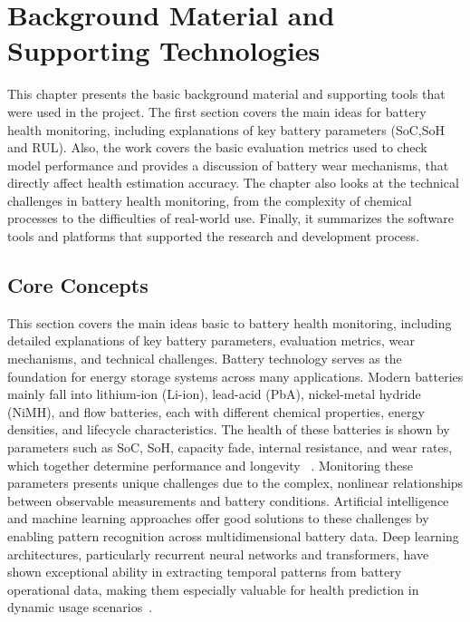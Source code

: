 \chapter{Background Material and Supporting Technologies}
\label{ch:background}

This chapter presents the basic background material and supporting tools that were used in the project. The first section covers the main ideas for battery health monitoring, including explanations of key battery parameters (SoC,SoH and RUL). Also, the work covers the basic evaluation metrics used to check model performance and provides a discussion of battery wear mechanisms, that directly affect health estimation accuracy. The chapter also looks at the technical challenges in battery health monitoring, from the complexity of chemical processes to the difficulties of real-world use. Finally, it summarizes the software tools and platforms that supported the research and development process.

\section{Core Concepts}

This section covers the main ideas basic to battery health monitoring, including detailed explanations of key battery parameters, evaluation metrics, wear mechanisms, and technical challenges. Battery technology serves as the foundation for energy storage systems across many applications. Modern batteries mainly fall into lithium-ion (Li-ion), lead-acid (PbA), nickel-metal hydride (NiMH), and flow batteries, each with different chemical properties, energy densities, and lifecycle characteristics. The health of these batteries is shown by parameters such as SoC, SoH, capacity fade, internal resistance, and wear rates, which together determine performance and longevity ~\cite{vijaychandra_comprehensive_2024}. Monitoring these parameters presents unique challenges due to the complex, nonlinear relationships between observable measurements and battery conditions. Artificial intelligence and machine learning approaches offer good solutions to these challenges by enabling pattern recognition across multidimensional battery data. Deep learning architectures, particularly recurrent neural networks and transformers, have shown exceptional ability in extracting temporal patterns from battery operational data, making them especially valuable for health prediction in dynamic usage scenarios~\cite{renold_comprehensive_2024}. 

